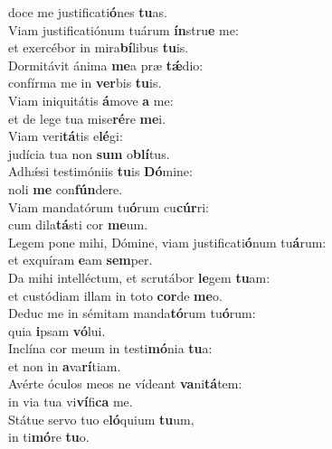 \evenverse doce me justificati\textbf{ó}nes \textbf{tu}as.\\
\oddverse Viam justificatiónum tuárum \textbf{ín}stru\textbf{e} me:~\*\\
\oddverse et exercébor in mira\textbf{bí}libus \textbf{tu}is.\\
\evenverse Dormitávit ánima \textbf{me}a præ \textbf{tǽ}dio:~\*\\
\evenverse confírma me in \textbf{ver}bis \textbf{tu}is.\\
\oddverse Viam iniquitátis \textbf{á}move \textbf{a} me:~\*\\
\oddverse et de lege tua mise\textbf{ré}re \textbf{me}i.\\
\evenverse Viam veri\textbf{tá}tis e\textbf{lé}gi:~\*\\
\evenverse judícia tua non \textbf{sum} o\textbf{blí}tus.\\
\oddverse Adhǽsi testimóniis \textbf{tu}is \textbf{Dó}mine:~\*\\
\oddverse noli \textbf{me} con\textbf{fún}dere.\\
\evenverse Viam mandatórum tu\textbf{ó}rum cu\textbf{cúr}ri:~\*\\
\evenverse cum dila\textbf{tá}sti cor \textbf{me}um.\\
\oddverse Legem pone mihi, Dómine, viam justificati\textbf{ó}num tu\textbf{á}rum:~\*\\
\oddverse et exquíram \textbf{e}am \textbf{sem}per.\\
\evenverse Da mihi intelléctum, et scrutábor \textbf{le}gem \textbf{tu}am:~\*\\
\evenverse et custódiam illam in toto \textbf{cor}de \textbf{me}o.\\
\oddverse Deduc me in sémitam manda\textbf{tó}rum tu\textbf{ó}rum:~\*\\
\oddverse quia \textbf{i}psam \textbf{vó}lui.\\
\evenverse Inclína cor meum in testi\textbf{mó}nia \textbf{tu}a:~\*\\
\evenverse et non in \textbf{a}va\textbf{rí}tiam.\\
\oddverse Avérte óculos meos ne vídeant \textbf{va}ni\textbf{tá}tem:~\*\\
\oddverse in via tua vi\textbf{ví}fi\textbf{ca} me.\\
\evenverse Státue servo tuo e\textbf{ló}quium \textbf{tu}um,~\*\\
\evenverse in ti\textbf{mó}re \textbf{tu}o.\\
